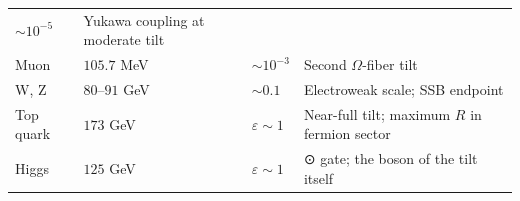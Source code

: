 \begin{longtable}[]{@{}llll@{}}
\begin{minipage}[t]{0.22\columnwidth}
\(\sim 10^{-5}\)\strut
\end{minipage} & \begin{minipage}[t]{0.22\columnwidth}\raggedright
Yukawa coupling at moderate tilt\strut
\end{minipage}\tabularnewline
\begin{minipage}[t]{0.22\columnwidth}\raggedright
Muon\strut
\end{minipage} & \begin{minipage}[t]{0.22\columnwidth}\raggedright
\(105.7\) MeV\strut
\end{minipage} & \begin{minipage}[t]{0.22\columnwidth}\raggedright
\(\sim 10^{-3}\)\strut
\end{minipage} & \begin{minipage}[t]{0.22\columnwidth}\raggedright
Second \(\Omega\)-fiber tilt\strut
\end{minipage}\tabularnewline
\begin{minipage}[t]{0.22\columnwidth}\raggedright
W, Z\strut
\end{minipage} & \begin{minipage}[t]{0.22\columnwidth}\raggedright
\(80\)--\(91\) GeV\strut
\end{minipage} & \begin{minipage}[t]{0.22\columnwidth}\raggedright
\(\sim 0.1\)\strut
\end{minipage} & \begin{minipage}[t]{0.22\columnwidth}\raggedright
Electroweak scale; SSB endpoint\strut
\end{minipage}\tabularnewline
\begin{minipage}[t]{0.22\columnwidth}\raggedright
Top quark\strut
\end{minipage} & \begin{minipage}[t]{0.22\columnwidth}\raggedright
\(173\) GeV\strut
\end{minipage} & \begin{minipage}[t]{0.22\columnwidth}\raggedright
\(\varepsilon \sim 1\)\strut
\end{minipage} & \begin{minipage}[t]{0.22\columnwidth}\raggedright
Near-full tilt; maximum \(R\) in fermion sector\strut
\end{minipage}\tabularnewline
\begin{minipage}[t]{0.22\columnwidth}\raggedright
Higgs\strut
\end{minipage} & \begin{minipage}[t]{0.22\columnwidth}\raggedright
\(125\) GeV\strut
\end{minipage} & \begin{minipage}[t]{0.22\columnwidth}\raggedright
\(\varepsilon \sim 1\)\strut
\end{minipage} & \begin{minipage}[t]{0.22\columnwidth}\raggedright
⊙ gate; the boson of the tilt itself\strut
\end{minipage}\tabularnewline
\bottomrule
\end{longtable}

